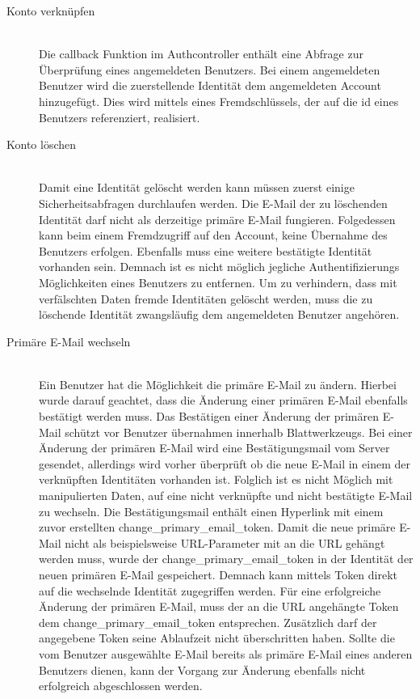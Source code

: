 \documentclass[paper=a4,fontsize=12pt,parskip=half]{scrartcl}
\begin{document}
	\begin{description}
		\item[Konto verknüpfen]\hfill\\
		Die callback Funktion im Authcontroller enthält eine Abfrage zur Überprüfung eines angemeldeten Benutzers. Bei einem angemeldeten Benutzer wird die zuerstellende Identität dem angemeldeten Account hinzugefügt. Dies wird mittels eines Fremdschlüssels, der auf die id eines Benutzers referenziert, realisiert.
		\item[Konto löschen]\hfill\\
		Damit eine Identität gelöscht werden kann müssen zuerst einige Sicherheitsabfragen durchlaufen werden. Die E-Mail der zu löschenden Identität darf nicht als derzeitige primäre E-Mail fungieren. Folgedessen kann beim einem Fremdzugriff auf den Account, keine Übernahme des Benutzers erfolgen. Ebenfalls muss eine weitere bestätigte Identität vorhanden sein. Demnach ist es nicht möglich jegliche Authentifizierungs Möglichkeiten eines Benutzers zu entfernen. Um zu verhindern, dass mit verfälschten Daten fremde Identitäten gelöscht werden, muss die zu löschende Identität zwangsläufig dem angemeldeten Benutzer angehören. 
		\item[Primäre E-Mail wechseln]\hfill\\
		Ein Benutzer hat die Möglichkeit die primäre E-Mail zu ändern. Hierbei wurde darauf geachtet, dass die Änderung einer primären E-Mail ebenfalls bestätigt werden muss. Das Bestätigen einer Änderung der primären E-Mail schützt vor Benutzer übernahmen innerhalb Blattwerkzeugs. Bei einer Änderung der primären E-Mail wird eine Bestätigungsmail vom Server gesendet, allerdings wird vorher überprüft ob die neue E-Mail in einem der verknüpften Identitäten vorhanden ist. Folglich ist es nicht Möglich mit manipulierten Daten, auf eine nicht verknüpfte und nicht bestätigte E-Mail zu wechseln. Die Bestätigungsmail enthält einen Hyperlink mit einem zuvor erstellten change\_primary\_email\_token. Damit die neue primäre E-Mail nicht als beispielsweise URL-Parameter mit an die \gls{URL} gehängt werden muss, wurde der change\_primary\_email\_token in der Identität der neuen primären E-Mail gespeichert. Demnach kann mittels Token direkt auf die wechselnde Identität zugegriffen werden. Für eine erfolgreiche Änderung der primären E-Mail, muss der an die \gls{URL} angehängte Token dem change\_primary\_email\_token entsprechen. Zusätzlich darf der angegebene Token seine Ablaufzeit nicht überschritten haben. Sollte die vom Benutzer ausgewählte E-Mail bereits als primäre E-Mail eines anderen Benutzers dienen, kann der Vorgang zur Änderung ebenfalls nicht erfolgreich abgeschlossen werden.

\end{description}
\end{document}
